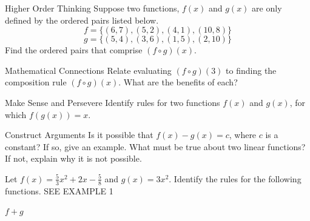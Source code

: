 \documentclass{article}
\newenvironment{practice}[2]{}{}        %
\newcommand{\answer}[1]{}               %
\begin{document}
\begin{practice}{16}{3}
Higher Order Thinking Suppose two functions, \(f(x)\) and \(g(x)\) are only defined by the ordered pairs listed below.
\[
f=\{(6,7),(5,2),(4,1),(10,8)\}
\]
\[
g=\{(5,4),(3,6),(1,5),(2,10)\}
\]
Find the ordered pairs that comprise \((f\circ g)(x)\).

\answer{\((f\circ g)(x)=\{(5,1),(3,7),(1,2),(2,8)\}\).}
\end{practice}

\begin{practice}{17}{2}
Mathematical Connections Relate evaluating \((f\circ g)(3)\) to finding the composition rule \((f\circ g)(x)\). What are the benefits of each?

\answer{Evaluating function composition for a specific value is finding \(g(3)\) and then substituting \(g(3)\) for \(x\) in \(f(x)\). This approach is good when you only want to find a few values. Finding the rule of \((f\circ g)(x)\) is similar in that you evaluate \(f(x)\) for the rule \(g(x)\), that is \(f(g(x))\). You can then recognize key features of the new function, including domain, range, and end behavior.}
\end{practice}

\begin{practice}{18}{2}
Make Sense and Persevere Identify rules for two functions \(f(x)\) and \(g(x)\), for which \(f(g(x))=x\).

\answer{Sample answer: If \(f(x)=\frac{1}{2}x\) and \(g(x)=2x\), then \(f(g(x))=x\).}
\end{practice}

\begin{practice}{19}{2}
Construct Arguments Is it possible that \(f(x)-g(x)=c\), where \(c\) is a constant? If so, give an example. What must be true about two linear functions? If not, explain why it is not possible.

\answer{It is possible; Sample: If the graphs of the two linear functions are parallel, then their difference will be a horizontal line; \(f(x)=3x-4\) and \(g(x)=3x+2\), so \(f(x)-g(x)=-6\), which represents a horizontal line.}
\end{practice}

\begin{practice}{20}{1}
Let \(f(x)=\frac{5}{3}x^2+2x-\frac{5}{8}\) and \(g(x)=3x^2\). Identify the rules for the following functions. SEE EXAMPLE 1

\(f+g\)

\answer{\(f+g=\frac{14}{3}x^2+2x-\frac{5}{8}\).}
\end{practice}
\end{document}

